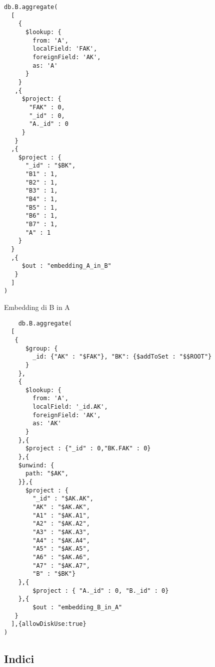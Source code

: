 \begin{verbatim}
db.B.aggregate(
  [
    {
      $lookup: {
        from: 'A',
        localField: 'FAK',
        foreignField: 'AK',
        as: 'A'
      }
    }
   ,{
     $project: {
       "FAK" : 0,
       "_id" : 0,
       "A._id" : 0
     }
   }
  ,{
    $project : {
      "_id" : "$BK",
      "B1" : 1,
      "B2" : 1,
      "B3" : 1,
      "B4" : 1,
      "B5" : 1,
      "B6" : 1,
      "B7" : 1,
      "A" : 1
    }
  }
  ,{
     $out : "embedding_A_in_B"
   }
  ]
)    
\end{verbatim}

Embedding di B in A

\begin{verbatim}
    db.B.aggregate(
  [
   {
      $group: {
        _id: {"AK" : "$FAK"}, "BK": {$addToSet : "$$ROOT"}
      }
    },
    {
      $lookup: {
        from: 'A',
        localField: '_id.AK',
        foreignField: 'AK',
        as: 'AK'
      }
    },{
      $project : {"_id" : 0,"BK.FAK" : 0}
    },{
    $unwind: {
      path: "$AK",
    }},{
      $project : {
        "_id" : "$AK.AK",
        "AK" : "$AK.AK", 
        "A1" : "$AK.A1", 
        "A2" : "$AK.A2", 
        "A3" : "$AK.A3", 
        "A4" : "$AK.A4",
        "A5" : "$AK.A5",
        "A6" : "$AK.A6",
        "A7" : "$AK.A7",
        "B" : "$BK"} 
    },{
        $project : { "A._id" : 0, "B._id" : 0}
    },{
        $out : "embedding_B_in_A"
   }
  ],{allowDiskUse:true}
)
\end{verbatim}
\subsection{Indici}
